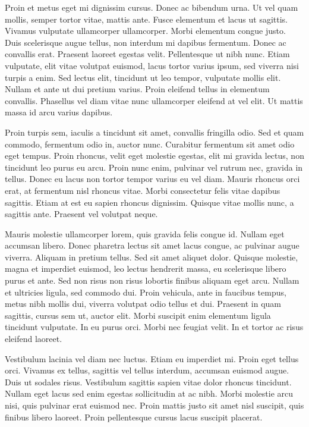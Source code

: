 Proin et metus eget mi dignissim cursus. Donec ac bibendum urna. Ut vel quam mollis, semper tortor vitae, mattis ante. Fusce elementum et lacus ut sagittis. Vivamus vulputate ullamcorper ullamcorper. Morbi elementum congue justo. Duis scelerisque augue tellus, non interdum mi dapibus fermentum. Donec ac convallis erat. Praesent laoreet egestas velit. Pellentesque ut nibh nunc. Etiam vulputate, elit vitae volutpat euismod, lacus tortor varius ipsum, sed viverra nisi turpis a enim. Sed lectus elit, tincidunt ut leo tempor, vulputate mollis elit. Nullam et ante ut dui pretium varius. Proin eleifend tellus in elementum convallis. Phasellus vel diam vitae nunc ullamcorper eleifend at vel elit. Ut mattis massa id arcu varius dapibus.

Proin turpis sem, iaculis a tincidunt sit amet, convallis fringilla odio. Sed et quam commodo, fermentum odio in, auctor nunc. Curabitur fermentum sit amet odio eget tempus. Proin rhoncus, velit eget molestie egestas, elit mi gravida lectus, non tincidunt leo purus eu arcu. Proin nunc enim, pulvinar vel rutrum nec, gravida in tellus. Donec eu lacus non tortor tempor varius eu vel diam. Mauris rhoncus orci erat, at fermentum nisl rhoncus vitae. Morbi consectetur felis vitae dapibus sagittis. Etiam at est eu sapien rhoncus dignissim. Quisque vitae mollis nunc, a sagittis ante. Praesent vel volutpat neque.

Mauris molestie ullamcorper lorem, quis gravida felis congue id. Nullam eget accumsan libero. Donec pharetra lectus sit amet lacus congue, ac pulvinar augue viverra. Aliquam in pretium tellus. Sed sit amet aliquet dolor. Quisque molestie, magna et imperdiet euismod, leo lectus hendrerit massa, eu scelerisque libero purus et ante. Sed non risus non risus lobortis finibus aliquam eget arcu. Nullam et ultricies ligula, sed commodo dui. Proin vehicula, ante in faucibus tempus, metus nibh mollis dui, viverra volutpat odio tellus et dui. Praesent in quam sagittis, cursus sem ut, auctor elit. Morbi suscipit enim elementum ligula tincidunt vulputate. In eu purus orci. Morbi nec feugiat velit. In et tortor ac risus eleifend laoreet.

Vestibulum lacinia vel diam nec luctus. Etiam eu imperdiet mi. Proin eget tellus orci. Vivamus ex tellus, sagittis vel tellus interdum, accumsan euismod augue. Duis ut sodales risus. Vestibulum sagittis sapien vitae dolor rhoncus tincidunt. Nullam eget lacus sed enim egestas sollicitudin at ac nibh. Morbi molestie arcu nisi, quis pulvinar erat euismod nec. Proin mattis justo sit amet nisl suscipit, quis finibus libero laoreet. Proin pellentesque cursus lacus suscipit placerat. 